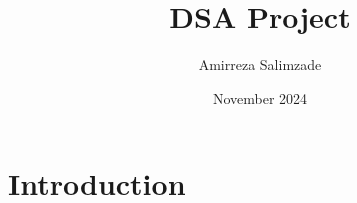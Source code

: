 \documentclass{article}
\title{DSA Project}
\author{Amirreza Salimzade}
\date{November 2024}
\begin{document}
\maketitle
\section{Introduction}
\end{document}
